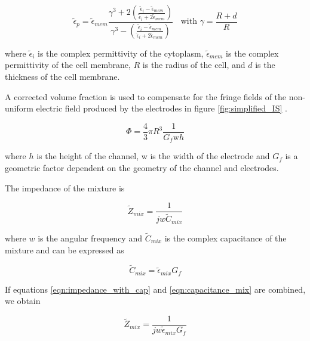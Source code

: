   \begin{equation}
      \tilde{\epsilon}_p = \tilde{\epsilon}_{mem} 
      \frac{\gamma^3+2(\frac{\tilde{\epsilon}_i - \tilde{\epsilon}_{mem}}
      {\tilde{\epsilon}_i + 2\tilde{\epsilon}_{mem}})}{\gamma^3 - (\frac{\tilde{\epsilon}_i - \tilde{\epsilon}_{mem}}{\tilde{\epsilon}_i + 2\tilde{\epsilon}_{mem}})} \;\;\text{  with } 
      \gamma = \frac{R + d}{R} 
  \end{equation}
  
  \noindent where $\tilde{\epsilon}_i$ is the complex permittivity of the cytoplasm, $\tilde{\epsilon}_{mem}$ is the complex permittivity of the cell membrane, $R$ is the radius of the cell, and $d$ is the thickness of the cell membrane.
  
  \par A corrected volume fraction is used to compensate for the fringe fields of the non-uniform electric field produced by the electrodes in figure \ref{fig:simplified_IS} \cite{gawad_micromachined_2001}. 
  
  \begin{equation}
      \Phi = \frac{4}{3} \pi R^3 \frac{1}{G_f\text{w}h}
      \label{eqn:corrected_vf}
  \end{equation}
  
  \noindent where $h$ is the height of the channel, w is the width of the electrode and $G_f$ is a geometric factor dependent on the geometry of the channel and electrodes.
  
  The impedance of the mixture is
  
  \begin{equation}
    \tilde{Z}_{mix} = \frac{1}{jw\tilde{C}_{mix}}
    \label{eqn:impedance_with_cap}
  \end{equation}
  
  \noindent where $w$ is the angular frequency and $\tilde{C}_{mix}$ is the complex capacitance of the mixture and can be expressed as
  
  \begin{equation}
      \tilde{C}_{mix} = \tilde{\epsilon}_{mix} G_f
      \label{eqn:capacitance_mix}
  \end{equation}
  
  \noindent If equations \ref{eqn:impedance_with_cap} and \ref{eqn:capacitance_mix} are combined, we obtain
  
  \begin{equation}
    \tilde{Z}_{mix} = \frac{1}{jw\tilde{\epsilon}_{mix}G_f}
    \label{eqn:impedance_with_Gf}
  \end{equation}
  
